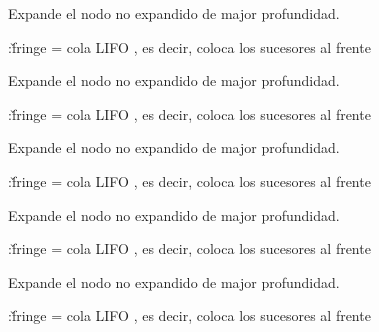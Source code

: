 \documentclass{article}
\begin{document}
\begin{huge}

Expande el nodo no expandido de major profundidad.

:\nl \v{fringe} = cola LIFO , es decir,
coloca los sucesores al frente

\textwidth
{}



Expande el nodo no expandido de major profundidad.

:\nl \v{fringe} = cola LIFO , es decir,
coloca los sucesores al frente

\textwidth
{}



Expande el nodo no expandido de major profundidad.

:\nl \v{fringe} = cola LIFO , es decir,
coloca los sucesores al frente

\textwidth
{}



Expande el nodo no expandido de major profundidad.

:\nl \v{fringe} = cola LIFO , es decir,
coloca los sucesores al frente

\textwidth
{}



Expande el nodo no expandido de major profundidad.

:\nl \v{fringe} = cola LIFO , es decir,
coloca los sucesores al frente

\textwidth
{}




\end{huge}
\end{document}

